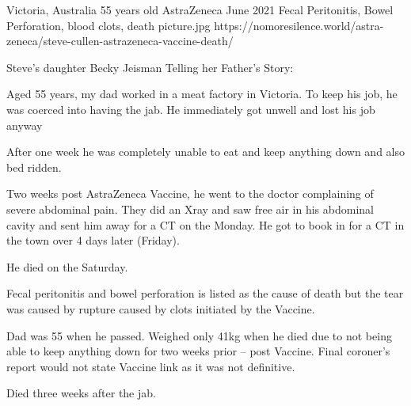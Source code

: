 {Victoria, Australia}
{55 years old}
{AstraZeneca}
{June 2021}
{Fecal Peritonitis, Bowel Perforation, blood clots, death}
{picture.jpg}
{https://nomoresilence.world/astra-zeneca/steve-cullen-astrazeneca-vaccine-death/}
{

Steve’s daughter Becky Jeisman Telling her Father’s Story:

Aged 55 years, my dad worked in a meat factory in Victoria. To keep his job, he
was coerced into having the jab. He immediately got unwell and lost his job
anyway

After one week he was completely unable to eat and keep anything down and also
bed ridden.

Two weeks post AstraZeneca Vaccine, he went to the doctor complaining of severe
abdominal pain. They did an Xray and saw free air in his abdominal cavity and
sent him away for a CT on the Monday. He got to book in for a CT in the town
over 4 days later (Friday).

He died on the Saturday.

Fecal peritonitis and bowel perforation is listed as the cause of death but the
tear was caused by rupture caused by clots initiated by the Vaccine.

Dad was 55 when he passed. Weighed only 41kg when he died due to not being able
to keep anything down for two weeks prior – post Vaccine.  Final coroner’s
report would not state Vaccine link as it was not definitive.

Died three weeks after the jab.

}
